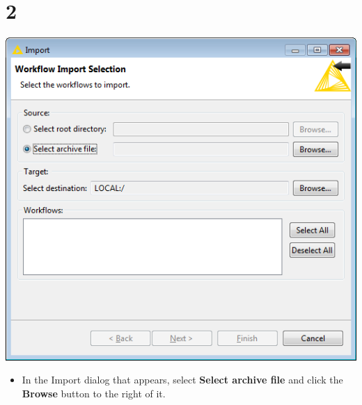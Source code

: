\documentclass{beamer}
\begin{document}
\section{2}
\begin{frame}
	\begin{center}
  		\includegraphics[height=0.7\textheight]{2.png}
	\end{center}
	\begin{itemize}
		\item In the Import dialog that appears, select \textbf{Select archive file} and click the \textbf{Browse} button to the right of it.
	\end{itemize}
\end{frame}
\end{document}
